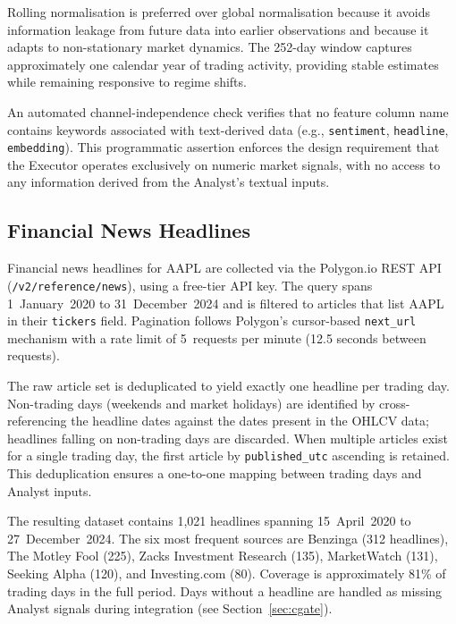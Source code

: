 Rolling normalisation is preferred over global normalisation because it avoids
information leakage from future data into earlier observations and because it
adapts to non-stationary market dynamics. The 252-day window captures
approximately one calendar year of trading activity, providing stable estimates
while remaining responsive to regime shifts.

An automated channel-independence check verifies that no feature column name
contains keywords associated with text-derived data (e.g., \texttt{sentiment},
\texttt{headline}, \texttt{embedding}). This programmatic assertion enforces
the design requirement that the Executor operates exclusively on numeric market
signals, with no access to any information derived from the Analyst's textual
inputs.

\subsection{Financial News Headlines} \label{sec:headlines}

Financial news headlines for AAPL are collected via the Polygon.io REST API
(\texttt{/v2/reference/news}), using a free-tier API key. The query spans
1~January~2020 to 31~December~2024 and is filtered to articles that list AAPL
in their \texttt{tickers} field. Pagination follows Polygon's cursor-based
\texttt{next\_url} mechanism with a rate limit of 5~requests per minute (12.5
seconds between requests).

The raw article set is deduplicated to yield exactly one headline per trading
day. Non-trading days (weekends and market holidays) are identified by
cross-referencing the headline dates against the dates present in the OHLCV
data; headlines falling on non-trading days are discarded. When multiple
articles exist for a single trading day, the first article by
\texttt{published\_utc} ascending is retained. This deduplication ensures a
one-to-one mapping between trading days and Analyst inputs.

The resulting dataset contains 1{,}021 headlines spanning 15~April~2020 to
27~December~2024. The six most frequent sources are Benzinga (312 headlines),
The Motley Fool (225), Zacks Investment Research (135), MarketWatch (131),
Seeking Alpha (120), and Investing.com (80). Coverage is approximately 81\% of
trading days in the full period. Days without a headline are handled as missing
Analyst signals during integration (see Section~\ref{sec:cgate}).


